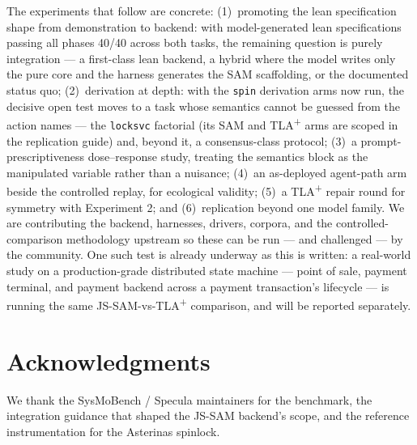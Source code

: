 \documentclass[11pt]{article}
\newcommand{\jssam}{JS-SAM}
\newcommand{\tlaplus}{TLA\texorpdfstring{\textsuperscript{+}}{+}}
\begin{document}
The experiments that follow are concrete: (1)~promoting the lean
specification shape from demonstration to backend: with model-generated
lean specifications passing all phases 40/40 across both tasks, the
remaining question is purely integration --- a first-class lean backend, a
hybrid where the model writes only the pure core and the harness generates
the SAM scaffolding, or the documented status quo; (2)~derivation at
depth: with the \texttt{spin} derivation arms now run, the decisive open
test moves to a task whose semantics cannot be guessed from the action
names --- the \texttt{locksvc} factorial (its SAM and \tlaplus{} arms are
scoped in the replication guide) and, beyond it, a consensus-class
protocol; (3)~a prompt-prescriptiveness
dose--response study, treating the semantics block as the manipulated
variable rather than a nuisance; (4)~an as-deployed agent-path arm beside
the controlled replay, for ecological validity; (5)~a \tlaplus{} repair
round for symmetry with Experiment 2; and (6)~replication beyond one model
family. We are contributing the backend, harnesses, drivers, corpora, and
the controlled-comparison methodology upstream so these can be run --- and
challenged --- by the community. One such test is already underway as this
is written: a real-world study on a production-grade distributed state
machine --- point of sale, payment terminal, and payment backend across a
payment transaction's lifecycle --- is running the same
\jssam{}-vs-\tlaplus{} comparison, and will be reported separately.

\section*{Acknowledgments}
We thank the SysMoBench / Specula maintainers for the benchmark, the
integration guidance that shaped the \jssam{} backend's scope, and the
reference instrumentation for the Asterinas spinlock.
\end{document}
